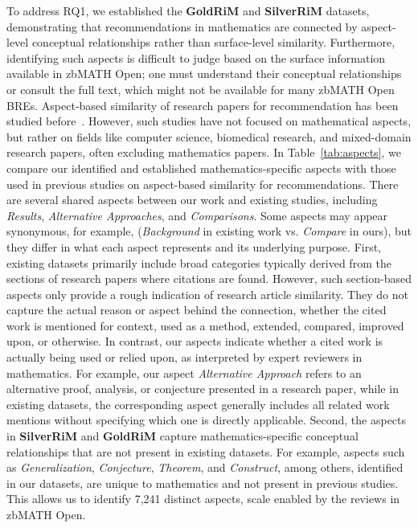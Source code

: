 \documentclass[sigconf,anonymous]{acmart}
\begin{document}
To address RQ1, we established the \textbf{GoldRiM} and \textbf{SilverRiM} datasets, demonstrating that recommendations in mathematics are connected by aspect-level conceptual relationships rather than surface-level similarity.
Furthermore, identifying such aspects is difficult to judge based on the surface information available in zbMATH Open; one must understand their conceptual relationships or consult the full text, which might not be available for many zbMATH Open BREs.
Aspect-based similarity of research papers for recommendation has been studied before~\cite{Ostendorff2022a,chakraborty2016ferosa,cohan2019structural}.
However, such studies have not focused on mathematical aspects, but rather on fields like computer science, biomedical research, and mixed-domain research papers, often excluding mathematics papers.
In Table~\ref{tab:aspects}, we compare our identified and established mathematics-specific aspects with those used in previous studies on aspect-based similarity for recommendations.
There are several shared aspects between our work and existing studies, including \textit{Results}, \textit{Alternative Approaches}, and \textit{Comparisons}.
Some aspects may appear synonymous, for example, (\textit{Background} in existing work vs. \textit{Compare} in ours), but they differ in what each aspect represents and its underlying purpose.
First, existing datasets primarily include broad categories typically derived from the sections of research papers where citations are found.
However, such section-based aspects only provide a rough indication of research article similarity.
They do not capture the actual reason or aspect behind the connection, whether the cited work is mentioned for context, used as a method, extended, compared, improved upon, or otherwise.
In contrast, our aspects indicate whether a cited work is actually being used or relied upon, as interpreted by expert reviewers in mathematics.
For example, our aspect \textit{Alternative Approach} refers to an alternative proof, analysis, or conjecture presented in a research paper, while in existing datasets, the corresponding aspect generally includes all related work mentions without specifying which one is directly applicable.
Second, the aspects in \textbf{SilverRiM} and \textbf{GoldRiM} capture mathematics-specific conceptual relationships that are not present in existing datasets.
For example, aspects such as \textit{Generalization}, \textit{Conjecture}, \textit{Theorem}, and \textit{Construct}, among others, identified in our datasets, are unique to mathematics and not present in previous studies.
This allows us to identify 7,241 distinct aspects, scale enabled by the reviews in zbMATH Open.
\end{document}
